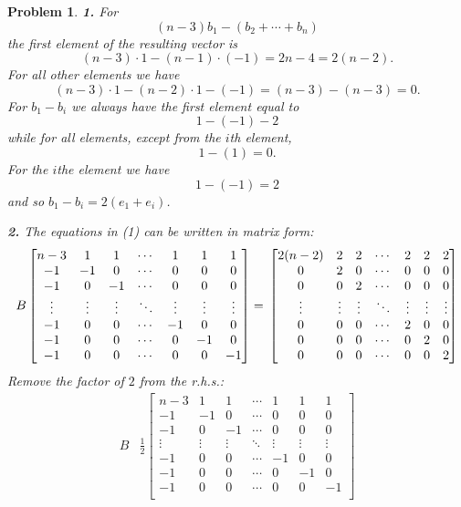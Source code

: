 \documentclass{article}
\newcommand{\subno}[1]{\par\noindent\textbf{#1}}
\theoremstyle{pprop}
\newtheorem{problem}{Problem}[section]
\begin{document}
\begin{problem}
\subno{1.} For 
$$
(n-3)b_1 - (b_2 + \cdots+b_n)
$$
the first element of the resulting vector is
$$
(n-3)\cdot1-(n-1)\cdot(-1)=2n-4=2(n-2).
$$
For all other elements we have 
$$
(n-3)\cdot1-(n-2)\cdot 1 -(-1)=(n-3)-(n-3)=0.
$$
For $b_1-b_i$ we always have the first element equal to
$$
1-(-1)-2
$$
while for all elements, except from the $i$th element,
$$
1-(1)=0.
$$
For the $i$the element we have
$$
1-(-1)=2
$$
and so $b_1-b_i=2(e_1+e_i)$.   
\subno{2.} The equations in (1) can be written in matrix form:
$$
B 
\begin{bmatrix}
n-3 & 1 & 1 & \cdots & 1 & 1 & 1 \\
-1 & -1 & 0 & \cdots & 0 & 0 & 0 \\
-1 & 0 & -1 & \cdots & 0 & 0 & 0 \\
\vdots & \vdots & \vdots & \ddots & \vdots & \vdots & \vdots \\
-1 & 0 & 0 & \cdots & -1 & 0 & 0 \\
-1 & 0 & 0 & \cdots & 0 & -1 & 0 \\
-1 & 0 & 0 & \cdots & 0 & 0 & -1 \\
\end{bmatrix}=\\
\begin{bmatrix}
2(n-2) & 2 & 2 & \cdots & 2 & 2 & 2 \\
0 & 2 & 0 & \cdots & 0 & 0 & 0 \\
0 & 0 & 2 & \cdots & 0 & 0 & 0 \\
\vdots & \vdots & \vdots & \ddots & \vdots & \vdots & \vdots \\
0 & 0 & 0 & \cdots & 2 & 0 & 0 \\
0 & 0 & 0 & \cdots & 0 & 2 & 0 \\
0 & 0 & 0 & \cdots & 0 & 0 & 2 \\
\end{bmatrix}
$$
Remove the factor of $2$ from the r.h.s.:
\begin{align*}
B & \frac12
\begin{bmatrix}
n-3 & 1 & 1 & \cdots & 1 & 1 & 1 \\
-1 & -1 & 0 & \cdots & 0 & 0 & 0 \\
-1 & 0 & -1 & \cdots & 0 & 0 & 0 \\
\vdots & \vdots & \vdots & \ddots & \vdots & \vdots & \vdots \\
-1 & 0 & 0 & \cdots & -1 & 0 & 0 \\
-1 & 0 & 0 & \cdots & 0 & -1 & 0 \\
-1 & 0 & 0 & \cdots & 0 & 0 & -1 \\

\end{bmatrix}
\end{align*}
\end{problem}
\end{document}
